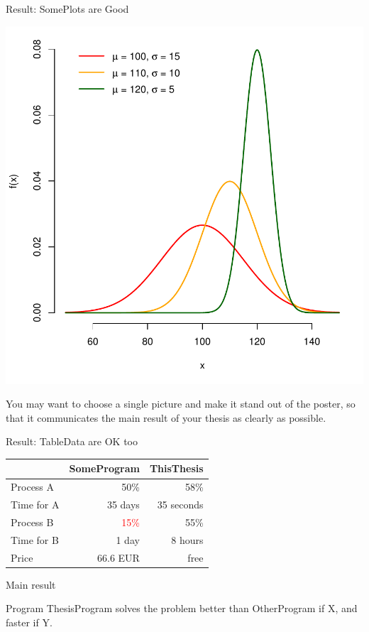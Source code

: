 \documentclass[portrait,a0paper,fontscale=0.25]{baposter}
\begin{document}
\begin{poster}
\begin{posterbox}[column=1, name=result1]{Result: SomePlots are Good}
\begin{center}
\includegraphics[width=0.7\linewidth]{img/ukazka-obr02.pdf}
\end{center}

You may want to choose a single picture and make it stand out of the poster, so that it communicates the main result of your thesis as clearly as possible.
\end{posterbox}

\begin{posterbox}[column=1, name=result2, below=result1]{Result: TableData are OK too}
\begin{center}
\begin{tabular}{lrr}
 & \textbf{SomeProgram} & \textbf{ThisThesis} \\
\hline
Process A & 50\% & 58\% \\
Time for A & 35 days & \textcolor{green!80!black}{35 seconds} \\
Process B & \textcolor{red}{15\%} & 55\% \\
Time for B & 1 day & 8 hours \\
Price & 66.6 EUR & free
\end{tabular}
\end{center}
\end{posterbox}

\begin{posterbox}[column=1, name=result3, below=result2, headerColorOne=green!50!yellow, boxColorOne=green!10]{Main result}
\large\bfseries
\vspace{1ex}
\begin{center}
Program ThesisProgram solves the problem better than OtherProgram if X, and faster if Y.
\end{center}
\vspace{.5ex}
\end{posterbox}


\end{poster}
\end{document}
